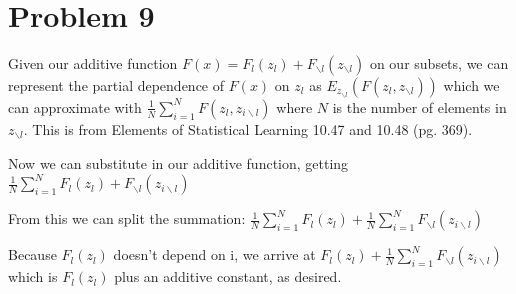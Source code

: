 \documentclass[11pt]{article}
\begin{document}
\begin{center}

\ \\
\end{center}


\section*{Problem 9}

\vspace{5 mm}
\noindent
Given our additive function $F(x) = F_{l}(z_{l}) + F_{\backslash l}(z_{\backslash l})$
 on our subsets, we can represent the partial dependence of $F(x)$ on $z_{l}$ as
  $E_{z_{\backslash l}}(F(z_{l}, z_{\backslash l}))$ which we can approximate with 
  $\frac{1}{N} \sum\limits_{i=1}^N F(z_{l}, z_{i\backslash l})$ where $N$ is the
   number of elements in $z_{\backslash l}$.  This is from Elements of Statistical
    Learning 10.47 and 10.48 (pg. 369).  

\noindent
Now we can substitute in our additive function, getting 
$\frac{1}{N} \sum\limits_{i=1}^N F_{l}(z_{l}) + F_{\backslash l}(z_{i\backslash l})$  

\noindent
From this we can split the summation: 
$\frac{1}{N} \sum\limits_{i=1}^N F_{l}(z_{l}) + \frac{1}{N} \sum\limits_{i=1}^N 
F_{\backslash l}(z_{i\backslash l})$ 

\noindent
Because $F_{l}(z_{l})$ doesn't depend on i, we arrive at $F_{l}(z_{l}) + \frac{1}{N}
 \sum\limits_{i=1}^N F_{\backslash l}(z_{i\backslash l})$ which is $F_{l}(z_{l})$ 
 plus an additive constant, as desired.
\end{document}
